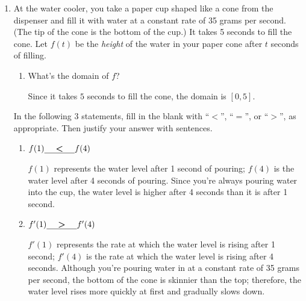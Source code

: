 \documentclass{article}
\theoremstyle{theorem}
\begin{document}
\begin{enumerate}
\begin{enumerate}
  \end{enumerate}

\item \label{fall2006-1a-midterm1-9-modified}  

  At the water cooler, you take a paper cup shaped like a cone from the dispenser and fill it with water at a constant rate of 35 grams per second. (The tip of the cone is the bottom of the cup.) It takes 5 seconds to fill the cone. Let $f(t)$ be the \emph{height} of the water in your paper cone after $t$ seconds of filling.

  \begin{enumerate}
  \item
    \begin{problem}[0.25in]
      What's the domain of $f$? 
    \end{problem}

    \begin{solution}
      Since it takes $5$ seconds to fill the cone, the domain is $\boxed{[0, 5]}$. 
    \end{solution}
  \end{enumerate}

  In the following 3 statements, fill in the blank with ``$<$'', ``$=$'', or ``$>$'', as appropriate. Then justify your answer with sentences.

  \begin{enumerate}[resume]
  \item

    \begin{problem}[\vfill]
      $f(1) \cfitb{0.5in}{<} f(4)$

    \end{problem}

    \begin{solution}
      $f(1)$ represents the water level after 1 second of pouring; $f(4)$
      is the water level after 4 seconds of pouring.  Since you're always
      pouring water into the cup, the water level is higher after 4
      seconds than it is after 1 second.  
    \end{solution}

  \item
    \begin{problem}[\vfill]
      $f'(1) \cfitb{0.5in}{>} f'(4)$

    \end{problem}

    \begin{solution}
      $f'(1)$ represents the rate at which the water level is rising after
      1 second; $f'(4)$ is the rate at which the water level is rising
      after 4 seconds.  Although you're pouring water in at a constant
      rate of 35 grams per second, the bottom of the cone is skinnier than
      the top; therefore, the water level rises more quickly at first and
      gradually slows down.
    \end{solution}


\end{enumerate}
\end{enumerate}
\end{document}
